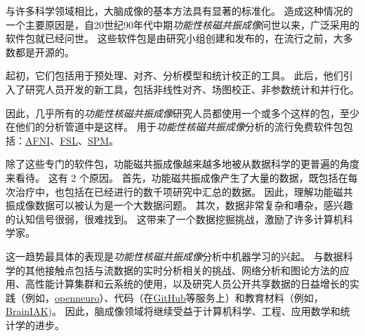 \begin{proposition}[神经解剖学导航术语] \label{box:6_1}
	
	\quad \quad 与许多科学领域相比，大脑成像的基本方法具有显著的标准化。
	造成这种情况的一个主要原因是，自20世纪90年代中期\textit{功能性核磁共振成像}问世以来，广泛采用的软件包就已经问世。
	这些软件包是由研究小组创建和发布的，在流行之前，大多数都是开源的。
	
	\quad \quad 起初，它们包括用于预处理、对齐、分析模型和统计校正的工具。
	此后，他们引入了研究人员开发的新工具，包括非线性对齐、场图校正、非参数统计和并行化。
	
	\quad \quad 因此，几乎所有的\textit{功能性核磁共振成像}研究人员都使用一个或多个这样的包，至少在他们的分析管道中是这样。
	用于\textit{功能性核磁共振成像}分析的流行免费软件包包括：\href{https://afni.nimh.nih.gov}{AFNI}、\href{https://fsl.fmrib.ox.ac.uk}{FSL}、\href{https://www.fil.ion.ucl.ac.uk/spm}{SPM}。
	
	\quad \quad 除了这些专门的软件包，功能磁共振成像越来越多地被从数据科学的更普遍的角度来看待。
	这有 2 个原因。
	首先，功能磁共振成像产生了大量的数据，既包括在每次治疗中，也包括在已经进行的数千项研究中汇总的数据。
	因此，理解功能磁共振成像数据可以被认为是一个大数据问题。
	其次，数据非常复杂和嘈杂，感兴趣的认知信号很弱，很难找到。
	这带来了一个数据挖掘挑战，激励了许多计算机科学家。
	
	\quad \quad 这一趋势最具体的表现是\textit{功能性核磁共振成像}分析中机器学习的兴起。
	与数据科学的其他接触点包括与流数据的实时分析相关的挑战、网络分析和图论方法的应用、高性能计算集群和云系统的使用，以及研究人员公开共享数据的日益增长的实践（例如，\href{https://openneuro.org}{openneuro}）、代码（在\href{https://github.com/}{GitHub}等服务上）和教育材料（例如，\href{https://brainiak.org/tutorials}{BrainIAK})。
	因此，脑成像领域将继续受益于计算机科学、工程、应用数学和统计学的进步。
	
\end{proposition}


